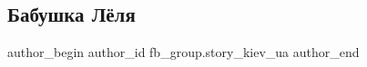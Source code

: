  
 
 
 
 
 
\subsection{Бабушка Лёля}
\label{sec:28_12_2021.fb.fb_group.story_kiev_ua.1.babushka_lelja}
 
\ifcmt
 author_begin
   author_id fb_group.story_kiev_ua
 author_end
\fi
